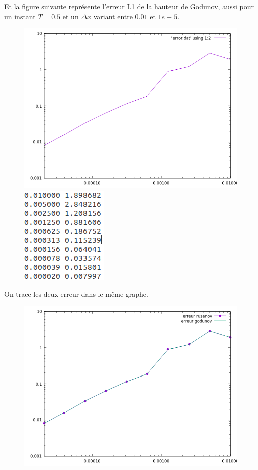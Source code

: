 Et la figure suivante repr\'esente l'erreur L1 de la hauteur de Godunov, aussi pour un instant $T = 0.5$ et un $\Delta x$ variant entre $0.01$ et $1e-5$.
\newpage
\begin{figure}[h!]
	\centering \includegraphics[scale=0.5]{Images_Fichiers/errorgodu100_05.png}
	\centering \includegraphics[scale=0.5]{Images_Fichiers/table_godu.png}
\end{figure}

On trace les deux erreur dans le m\^eme graphe.

\begin{figure}[h!]
	\centering \includegraphics[scale=0.5]{Images_Fichiers/error_rusa_godu.png}

\end{figure}

